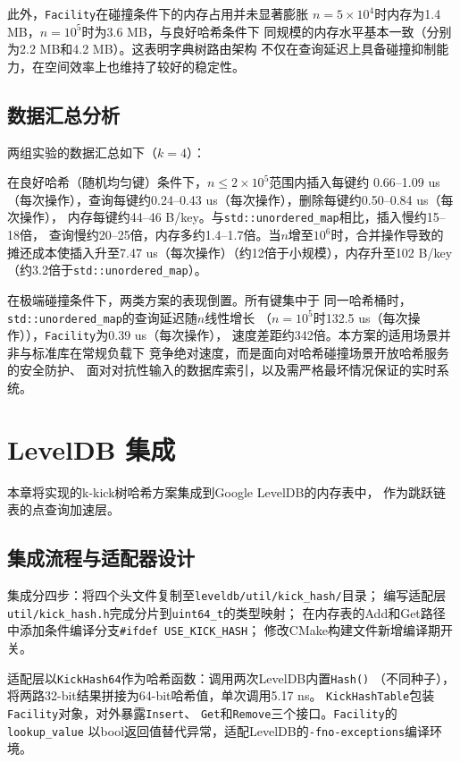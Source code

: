 \documentclass[
    type = bachelor,
    fontset = win,
    decl-page = true,
  ]{njuthesis}
\begin{document}
此外，\texttt{Facility}在碰撞条件下的内存占用并未显著膨胀
$n=5\times10^4$时内存为1.4 MB，$n=10^5$时为3.6 MB，与良好哈希条件下
同规模的内存水平基本一致（分别为2.2 MB和4.2 MB）。这表明字典树路由架构
不仅在查询延迟上具备碰撞抑制能力，在空间效率上也维持了较好的稳定性。

\section{数据汇总分析}

两组实验的数据汇总如下（$k=4$）：

在良好哈希（随机均匀键）条件下，$n\leq 2\times10^5$范围内插入每键约
0.66--1.09 us（每次操作），查询每键约0.24--0.43 us（每次操作），删除每键约0.50--0.84 us（每次操作），
内存每键约44--46 B/key。与\texttt{std::unordered\_map}相比，插入慢约15--18倍，
查询慢约20--25倍，内存多约1.4--1.7倍。当$n$增至$10^6$时，合并操作导致的
摊还成本使插入升至7.47 us（每次操作）（约12倍于小规模），内存升至102 B/key
（约3.2倍于\texttt{std::unordered\_map}）。

在极端碰撞条件下，两类方案的表现倒置。所有键集中于
同一哈希桶时，\texttt{std::unordered\_map}的查询延迟随$n$线性增长
（$n=10^5$时132.5 us（每次操作）），\texttt{Facility}为0.39 us（每次操作），
速度差距约342倍。本方案的适用场景并非与标准库在常规负载下
竞争绝对速度，而是面向对哈希碰撞场景开放哈希服务的安全防护、
面对对抗性输入的数据库索引，以及需严格最坏情况保证的实时系统。

\chapter{LevelDB 集成}

本章将实现的k-kick树哈希方案集成到Google LevelDB\cite{2}的内存表中，
作为跳跃链表的点查询加速层。

\section{集成流程与适配器设计}

集成分四步：将四个头文件复制至\texttt{leveldb/util/kick\_hash/}目录；
编写适配层\texttt{util/kick\_hash.h}完成分片到\texttt{uint64\_t}的类型映射；
在内存表的Add和Get路径中添加条件编译分支\texttt{\#ifdef USE\_KICK\_HASH}；
修改CMake构建文件新增编译期开关。

适配层以\texttt{KickHash64}作为哈希函数：调用两次LevelDB内置\texttt{Hash()}
（不同种子），将两路32-bit结果拼接为64-bit哈希值，单次调用5.17 ns。
\texttt{KickHashTable}包装\texttt{Facility}对象，对外暴露\texttt{Insert}、
\texttt{Get}和\texttt{Remove}三个接口。\texttt{Facility}的\texttt{lookup\_value}
以bool返回值替代异常，适配LevelDB的\texttt{-fno-exceptions}编译环境。
\end{document}
